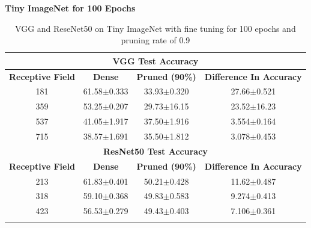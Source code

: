 \textbf{ Tiny ImageNet for 100 Epochs}
\begin{table}[H]
  \centering
\begin{tabular}{@{}cccc@{}}
\toprule
\multicolumn{4}{c}{\textbf{VGG  Test Accuracy}}                                                                    \\ \midrule
\textbf{Receptive Field} & \textbf{Dense}  & \textbf{Pruned (90\%)} & \multicolumn{1}{l}{\textbf{Difference In Accuracy}} \\ \midrule
181                      & 61.58$\pm$0.333 & 33.93$\pm$0.320 & 27.66$\pm$0.521                                     \\
359                      & 53.25$\pm$0.207 & 29.73$\pm$16.15 & 23.52$\pm$16.23                                     \\
537                      & 41.05$\pm$1.917 & 37.50$\pm$1.916 & 3.554$\pm$0.164                                     \\
715                      & 38.57$\pm$1.691 & 35.50$\pm$1.812 & 3.078$\pm$0.453                                     \\ \midrule
\multicolumn{4}{c}{\textbf{ResNet50 Test Accuracy}}                                                                \\ \midrule
\textbf{Receptive Field} & \textbf{Dense}  & \textbf{Pruned (90\%)} & \textbf{Difference In Accuracy}                     \\
\midrule
213                      & 61.83$\pm$0.401 & 50.21$\pm$0.428 & 11.62$\pm$0.487                                     \\
318                      & 59.10$\pm$0.368 & 49.83$\pm$0.583 & 9.274$\pm$0.413                                     \\
423                      & 56.53$\pm$0.279 & 49.43$\pm$0.403 & 7.106$\pm$0.361                                     \\
\bottomrule \\
\end{tabular}
\caption{VGG and ReseNet50 on Tiny ImageNet with fine tuning for 100 epochs and pruning rate of 0.9}
\label{tab:tiny imagenet fine tuning pruning rate 09}
\end{table}




